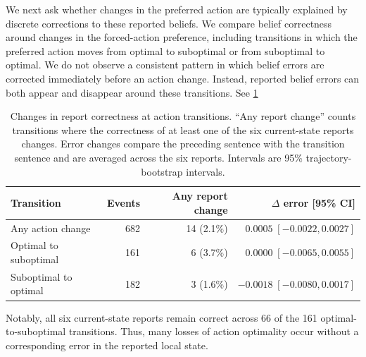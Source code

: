\documentclass{article}
\begin{document}
We next ask whether changes in the preferred action are typically explained by
discrete corrections to these reported beliefs. We compare belief correctness
around changes in the forced-action preference, including transitions in which
the preferred action moves from optimal to suboptimal or from suboptimal to
optimal. We do not observe a consistent pattern in which belief errors are
corrected immediately before an action change. Instead, reported belief errors
can both appear and disappear around these transitions. See \cref{tab:belief-action-transitions}



\begin{table}[t]
\centering
\small
\begin{tabular}{lrrr}
\toprule
Transition & Events & Any report change & $\Delta$ error [95\% CI] \\
\midrule
Any action change
    & 682 & 14 (2.1\%) & $0.0005\;[-0.0022,0.0027]$ \\
Optimal to suboptimal
    & 161 & 6 (3.7\%) & $0.0000\;[-0.0065,0.0055]$ \\
Suboptimal to optimal
    & 182 & 3 (1.6\%) & $-0.0018\;[-0.0080,0.0017]$ \\
\bottomrule
\end{tabular}
\caption{Changes in report correctness at action transitions. ``Any report
change'' counts transitions where the correctness of at least one of the six
current-state reports changes. Error changes compare the preceding sentence
with the transition sentence and are averaged across the six reports.
Intervals are 95\% trajectory-bootstrap intervals.}
\label{tab:belief-action-transitions}
\end{table}

Notably, all six current-state reports remain correct across 66 of the 161
optimal-to-suboptimal transitions. Thus, many losses of action optimality occur
without a corresponding error in the reported local state.
\end{document}
